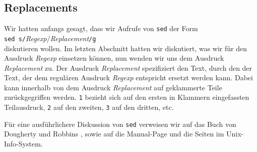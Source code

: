 \subsection{Replacements}
Wir hatten anfangs gesagt, dass wir Aufrufe von \texttt{sed} der Form
\\[0.2cm]
\hspace*{1.3cm}
\texttt{sed s/}\textsl{Regexp}/\textsl{Replacement}\texttt{/g}
\\[0.2cm]
diskutieren wollen.  Im letzten Abschnitt hatten wir diskutiert, was wir f\"ur den Ausdruck
\textsl{Regexp} einsetzen k\"onnen, nun wenden wir uns dem Ausdruck \textsl{Replacement} zu.
Der Ausdruck \textsl{Replacement} spezifiziert den Text, durch den der Text, der dem
regul\"aren Ausdruck \textsl{Regexp} entspricht ersetzt werden kann.  Dabei kann innerhalb
von dem Ausdruck \textsl{Replacement} auf geklammerte Teile zur\"uckgegriffen werden.
\texttt{1} bezieht sich auf den ersten in Klammern eingefassten  Teilausdruck,
\texttt{2} auf den zweiten,
\texttt{3} auf den dritten, etc.

F\"ur eine ausf\"uhrlichere Diskussion von \texttt{sed} verweisen wir auf das Buch
von Dougherty und Robbins \cite{dougherty:1997}, sowie auf die Manual-Page und die Seiten
im Unix-Info-System.


